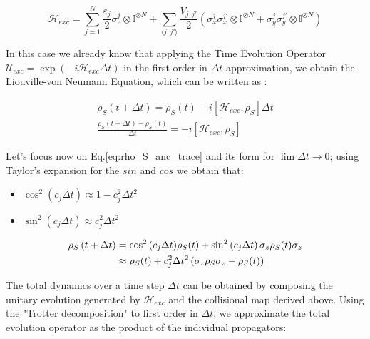\documentclass[a4paper,12pt]{article}
\begin{document}
	\begin{equation}
		\mathcal{H}_{exc} = \sum_{j=1}^{N} {\frac{\varepsilon_j}{2} \sigma_{z}^{j} \otimes \mathbb{I}^{\otimes N} } + \sum_{\langle j,j' \rangle} {\frac{V_{j,j'}}{2} \left( \sigma_{x}^{j}\sigma_{x}^{j'} \otimes \mathbb{I}^{\otimes N} + \sigma_{y}^{j}\sigma_{y}^{j'} \otimes \mathbb{I}^{\otimes N} \right)}
		\label{eq:H_exc}
	\end{equation}

	In this case we already know that applying the Time Evolution Operator $ \mathcal{U}_{exc} = \exp {\left( -i \mathcal{H}_{exc}\Delta t \right)} $ in the first order in $ \Delta t $ approximation, we obtain the Liouville-von Neumann Equation, which can be written as :

	\begin{align}
		\rho_S \left(t + \Delta t\right) = \rho_S (t) - i \left[\mathcal{H}_{exc}, \rho_S \right] \Delta t \\
		\frac{\rho_S \left(t + \Delta t\right) - \rho_S (t)}{\Delta t} = - i \left[\mathcal{H}_{exc}, \rho_S \right]
		\label{eq:Liouville_von_Neumann}
	\end{align}

	Let's focus now on Eq.\ref{eq:rho_S_anc_trace} and its form for $ \lim \Delta t \rightarrow 0  $; using Taylor's expansion for the $ sin $ and $ cos $ we obtain that:

	\begin{itemize}
		\item $ \cos^{2}{\left(c_{j} \Delta t \right)} \approx 1 - c_{j}^{2} \Delta t ^{2} $
		\item $ \sin^{2}{\left(c_{j} \Delta t \right)} \approx c_{j}^{2} \Delta t ^{2} $
		\label{eq:sin_cos_approx}
	\end{itemize}
	\begin{align}
		\rho_S \left(t + \Delta t\right) & = \cos^{2}{\left(c_{j} \Delta t\right)} \rho_S (t) + \sin^{2}{\left(c_{j} \Delta t\right)} \, \sigma_{z} \rho_S (t) \sigma_{z} \notag \\
		& \approx \rho_S (t) + c_{j}^{2} \Delta t ^{2} \left( \sigma_{z} \rho_S \sigma_{z} - \rho_S (t) \right)
		\label{eq:rho_approx}
	\end{align}

	The total dynamics over a time step $\Delta t$ can be obtained by composing the unitary evolution generated by $\mathcal{H}_{exc}$ and the collisional map derived above. Using the "Trotter decomposition" to first order in $\Delta t$, we approximate the total evolution operator as the product of the individual propagators:
\end{document}
